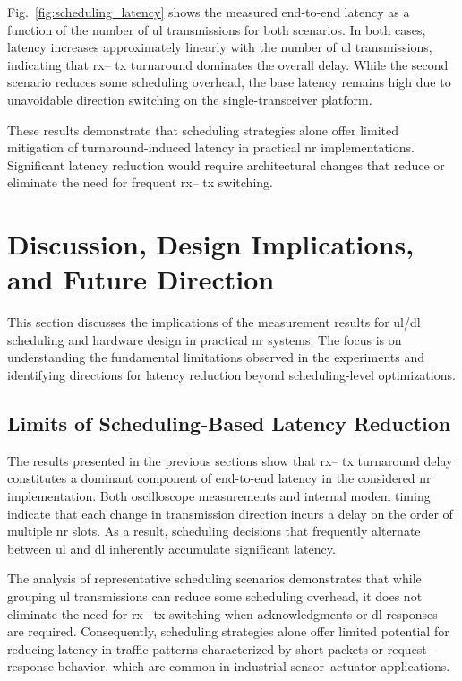 \documentclass[conference]{IEEEtran}
\begin{document}
Fig.~\ref{fig:scheduling_latency} shows the measured end-to-end latency as a function of the number of \gls{ul} transmissions for both scenarios. In both cases, latency increases approximately linearly with the number of \gls{ul} transmissions, indicating that  \gls{rx}-- \gls{tx} turnaround dominates the overall delay. While the second scenario reduces some scheduling overhead, the base latency remains high due to unavoidable direction switching on the single-transceiver platform.

These results demonstrate that scheduling strategies alone offer limited mitigation of turnaround-induced latency in practical \gls{nr} implementations. Significant latency reduction would require architectural changes that reduce or eliminate the need for frequent  \gls{rx}-- \gls{tx} switching.


\section{Discussion, Design Implications, and Future Direction}

This section discusses the implications of the measurement results for \gls{ul}/\gls{dl} scheduling and hardware design in practical \gls{nr} systems. The focus is on understanding the fundamental limitations observed in the experiments and identifying directions for latency reduction beyond scheduling-level optimizations.

\subsection{Limits of Scheduling-Based Latency Reduction}

The results presented in the previous sections show that  \gls{rx}-- \gls{tx} turnaround delay constitutes a dominant component of end-to-end latency in the considered \gls{nr} implementation. Both oscilloscope measurements and internal modem timing indicate that each change in transmission direction incurs a delay on the order of multiple \gls{nr} slots. As a result, scheduling decisions that frequently alternate between \gls{ul} and \gls{dl} inherently accumulate significant latency.

The analysis of representative scheduling scenarios demonstrates that while grouping \gls{ul} transmissions can reduce some scheduling overhead, it does not eliminate the need for  \gls{rx}-- \gls{tx} switching when acknowledgments or \gls{dl} responses are required. Consequently, scheduling strategies alone offer limited potential for reducing latency in traffic patterns characterized by short packets or request--response behavior, which are common in industrial sensor--actuator applications.
\end{document}
